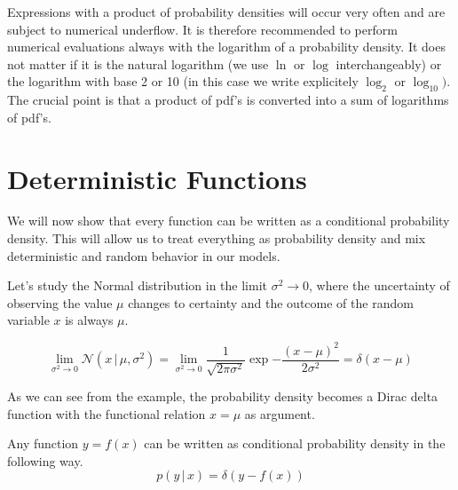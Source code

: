 \documentclass{tstextbook}
\begin{document}
\begin{remark}
Expressions with a product of probability densities will occur very often and are subject to numerical underflow. It is therefore recommended to perform numerical evaluations always with the logarithm of a probability density. It does not matter if it is the natural logarithm (we use $\ln$ or $\log$ interchangeably) or the logarithm with base 2 or 10 (in this case we write explicitely $\log_2$ or $\log_{10})$. The crucial point is that a product of pdf's is converted into a sum of logarithms of pdf's.
\end{remark}

\section{Deterministic Functions}
We will now show that every function can be written as a conditional probability density. This will allow us to treat everything as probability density and mix deterministic and random behavior in our models.

Let's study the Normal distribution in the limit $\sigma^2\rightarrow 0$, where the uncertainty of observing the value $\mu$ changes to certainty and the outcome of the random variable $x$ is always $\mu$.

\begin{example}
  \begin{equation}
    \lim_{\sigma^2\rightarrow 0}\mathcal{N}\left(x\,\vert\,\mu,\sigma^2\right)= \lim_{\sigma^2\rightarrow 0}\frac{1}{\sqrt{2\pi\sigma^2}}\exp{-\frac{(x-\mu)^2}{2\sigma^2}}=
\delta\left(x-\mu\right)
  \end{equation}
\end{example}

As we can see from the example, the probability density becomes a Dirac delta function with the functional relation $x=\mu$ as argument.

\begin{definition}
  \label{th:deterministicprobabilitydensity}
  Any function $y=f(x)$ can be written as conditional probability density in the following way.
  \begin{equation}
    p(y\,\vert\,x)=\delta\left(y-f(x)\right)
  \end{equation} 
\end{definition}
\end{document}
